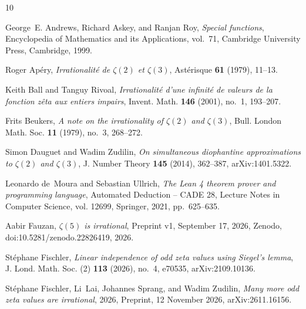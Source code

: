 \documentclass[11pt]{amsart}
\theoremstyle{definition}
\theoremstyle{remark}
\numberwithin{equation}{section}
\begin{document}
\providecommand{\bysame}{\leavevmode\hbox to3em{\hrulefill}\thinspace}
\providecommand{\MR}{\relax\ifhmode\unskip\space\fi MR }
\providecommand{\MRhref}[2]{%
  \href{http://www.ams.org/mathscinet-getitem?mr=#1}{#2}
}
\providecommand{\href}[2]{#2}
\begin{thebibliography}{10}

George~E. Andrews, Richard Askey, and Ranjan Roy, \emph{Special functions},
  Encyclopedia of Mathematics and its Applications, vol.~71, Cambridge
  University Press, Cambridge, 1999.

Roger Ap\'ery, \emph{Irrationalit\'e de {$\zeta(2)$} et {$\zeta(3)$}},
  Ast\'erisque \textbf{61} (1979), 11--13.

Keith Ball and Tanguy Rivoal, \emph{Irrationalit\'e d'une infinit\'e de valeurs
  de la fonction z\^eta aux entiers impairs}, Invent. Math. \textbf{146}
  (2001), no.~1, 193--207.

Frits Beukers, \emph{A note on the irrationality of {$\zeta(2)$} and
  {$\zeta(3)$}}, Bull. London Math. Soc. \textbf{11} (1979), no.~3, 268--272.

Simon Dauguet and Wadim Zudilin, \emph{On simultaneous diophantine
  approximations to {$\zeta(2)$} and {$\zeta(3)$}}, J. Number Theory
  \textbf{145} (2014), 362--387,
  \href{https://arxiv.org/abs/1401.5322}{arXiv:1401.5322}.

Leonardo de~Moura and Sebastian Ullrich, \emph{The {L}ean 4 theorem prover and
  programming language}, Automated Deduction -- CADE 28, Lecture Notes in
  Computer Science, vol. 12699, Springer, 2021, pp.~625--635.

Aabir Fauzan, \emph{{$\zeta(5)$} is irrational}, Preprint v1, September 17,
  2026, Zenodo,
  \href{https://doi.org/10.5281/zenodo.22826419}{doi:10.5281/zenodo.22826419},
  2026.

St\'ephane Fischler, \emph{Linear independence of odd zeta values using
  {S}iegel's lemma}, J. Lond. Math. Soc. (2) \textbf{113} (2026), no.~4,
  e70535, \href{https://arxiv.org/abs/2109.10136}{arXiv:2109.10136}.

St\'ephane Fischler, Li~Lai, Johannes Sprang, and Wadim Zudilin, \emph{Many
  more odd zeta values are irrational}, 2026, Preprint, 12 November 2026,
  \href{https://arxiv.org/abs/2611.16156}{arXiv:2611.16156}.


\end{thebibliography}
\end{document}
